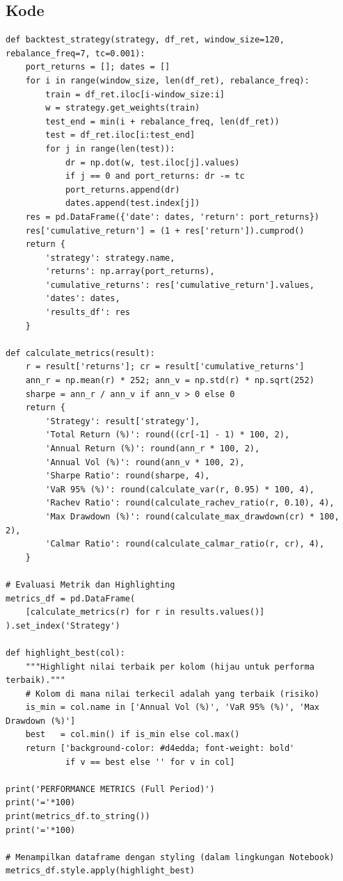 \documentclass[12pt,a4paper]{article}
\begin{document}
\subsection{Kode}
\begin{lstlisting}[caption={Framework backtesting dan metrik}]
def backtest_strategy(strategy, df_ret, window_size=120, rebalance_freq=7, tc=0.001):
    port_returns = []; dates = []
    for i in range(window_size, len(df_ret), rebalance_freq):
        train = df_ret.iloc[i-window_size:i]
        w = strategy.get_weights(train)
        test_end = min(i + rebalance_freq, len(df_ret))
        test = df_ret.iloc[i:test_end]
        for j in range(len(test)):
            dr = np.dot(w, test.iloc[j].values)
            if j == 0 and port_returns: dr -= tc
            port_returns.append(dr)
            dates.append(test.index[j])
    res = pd.DataFrame({'date': dates, 'return': port_returns})
    res['cumulative_return'] = (1 + res['return']).cumprod()
    return {
        'strategy': strategy.name,
        'returns': np.array(port_returns),
        'cumulative_returns': res['cumulative_return'].values,
        'dates': dates,
        'results_df': res
    }

def calculate_metrics(result):
    r = result['returns']; cr = result['cumulative_returns']
    ann_r = np.mean(r) * 252; ann_v = np.std(r) * np.sqrt(252)
    sharpe = ann_r / ann_v if ann_v > 0 else 0
    return {
        'Strategy': result['strategy'],
        'Total Return (%)': round((cr[-1] - 1) * 100, 2),
        'Annual Return (%)': round(ann_r * 100, 2),
        'Annual Vol (%)': round(ann_v * 100, 2),
        'Sharpe Ratio': round(sharpe, 4),
        'VaR 95% (%)': round(calculate_var(r, 0.95) * 100, 4),
        'Rachev Ratio': round(calculate_rachev_ratio(r, 0.10), 4),
        'Max Drawdown (%)': round(calculate_max_drawdown(cr) * 100, 2),
        'Calmar Ratio': round(calculate_calmar_ratio(r, cr), 4),
    }

# Evaluasi Metrik dan Highlighting
metrics_df = pd.DataFrame(
    [calculate_metrics(r) for r in results.values()]
).set_index('Strategy')

def highlight_best(col):
    """Highlight nilai terbaik per kolom (hijau untuk performa terbaik)."""
    # Kolom di mana nilai terkecil adalah yang terbaik (risiko)
    is_min = col.name in ['Annual Vol (%)', 'VaR 95% (%)', 'Max Drawdown (%)']
    best   = col.min() if is_min else col.max()
    return ['background-color: #d4edda; font-weight: bold'
            if v == best else '' for v in col]

print('PERFORMANCE METRICS (Full Period)')
print('='*100)
print(metrics_df.to_string())
print('='*100)

# Menampilkan dataframe dengan styling (dalam lingkungan Notebook)
metrics_df.style.apply(highlight_best)
\end{lstlisting}
\end{document}

